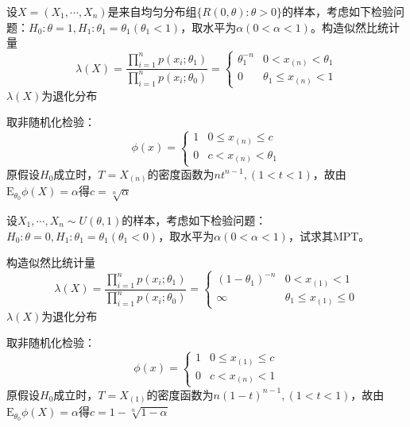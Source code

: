 \begin{example}
    设$X = (X_1,\cdots,X_n)$是来自均匀分布组$\{ R(0,\theta):\theta>0 \}$的样本，考虑如下检验问题：$H_0:\theta = 1,H_1:\theta_1 = \theta_1(\theta_1<1)$，取水平为$\alpha(0<\alpha<1)$。构造似然比统计量
    \[
        \lambda(X) = \dfrac{\prod_{i = 1}^{n}p(x_i;\theta_1)}{\prod_{i = 1}^{n}p(x_i;\theta_0)} = \left\{
            \begin{array}{ll}
                \theta_1^{-n} & 0<x_{(n)}<\theta_1\\
                0 & \theta_1\leq x_{(n)} < 1 
            \end{array}
        \right.
    \]
    $\lambda(X)$为退化分布

    取非随机化检验：
    \[
        \phi(x) = \left\{
            \begin{array}{ll}
                1 & 0\leq x_{(n)}\leq c\\
                0 & c< x_{(n)}<\theta_1
            \end{array}
        \right.
    \]
    原假设$H_0$成立时，$T = X_{(n)}$的密度函数为$nt^{n-1},(1<t<1)$，故由$\mathrm{E}_{\theta_0}\phi(X) = \alpha$得$c = \sqrt[n]{\alpha}$
\end{example}
\begin{example}
    设$X_1,\cdots,X_n \sim U(\theta,1)$的样本，考虑如下检验问题：$H_0:\theta = 0,H_1:\theta_1 = \theta_1(\theta_1<0)$，取水平为$\alpha(0<\alpha<1)$，试求其MPT。
    
    构造似然比统计量
    \[
        \lambda(X) = \dfrac{\prod_{i = 1}^{n}p(x_i;\theta_1)}{\prod_{i = 1}^{n}p(x_i;\theta_0)} = \left\{
            \begin{array}{ll}
                (1-\theta_1)^{-n} & 0<x_{(1)}<1\\
                \infty & \theta_1\leq x_{(1)} \leq 0 
            \end{array}
        \right.
    \]
    $\lambda(X)$为退化分布

    取非随机化检验：
    \[
        \phi(x) = \left\{
            \begin{array}{ll}
                1 & 0 \leq x_{(1)} \leq c\\
                0 & c < x_{(n)} < 1
            \end{array}
        \right.
    \]
    原假设$H_0$成立时，$T = X_{(1)}$的密度函数为$n(1-t)^{n-1},(1<t<1)$，故由$\mathrm{E}_{\theta_0}\phi(X) = \alpha$得$c = 1-\sqrt[n]{1-\alpha}$
\end{example}